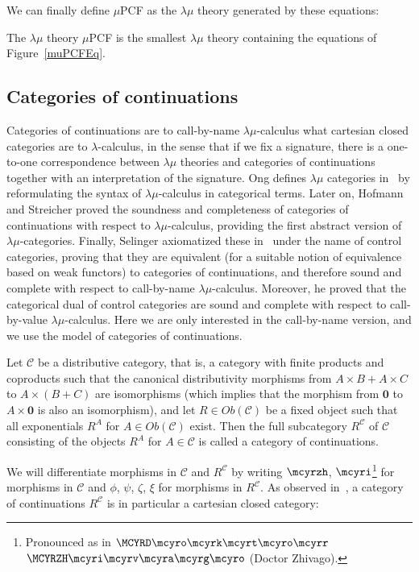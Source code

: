 \documentclass{CSML}
\newcommand*\CatC{\mathcal{C}}
\newcommand*\CatObj[1]{Ob\left(#1\right)}
\newcommand*\CatObjA{A}
\newcommand*\CatObjB{B}
\newcommand*\CatObjC{C}
\newcommand*\CatR{R}
\newcommand*\CatRC{\CatExp{\CatR}{\CatC}}
\newcommand*\CatTimes\times
\newcommand*\CatPlus{+}
\newcommand*\CatExp[2]{#1^{#2}}
\newcommand*\CatRCHomA\phi
\newcommand*\CatRCHomB\psi
\newcommand*\CatRCHomC\zeta
\newcommand*\CatRCHomD\xi
\newcommand*\CatCHomA\mcyrzh
\newcommand*\CatCHomB\mcyri
\newcommand*\CatInit{\mathbf{0}}
\begin{document}
We can finally define $\mu$PCF as the $\lambda\mu$ theory generated by these equations:
\begin{defi}[$\mu$PCF]
The $\lambda\mu$ theory $\mu$PCF is the smallest $\lambda\mu$ theory containing the equations of Figure~\ref{muPCFEq}.
\end{defi}
\subsection{Categories of continuations}
\label{catcont}
Categories of continuations are to call-by-name $\lambda\mu$-calculus what cartesian closed categories are to $\lambda$-calculus, in the sense that if we fix a signature, there is a one-to-one correspondence between $\lambda\mu$ theories and categories of continuations together with an interpretation of the signature. Ong defines $\lambda\mu$ categories in~\cite{OngClassicalProofs} by reformulating the syntax of $\lambda\mu$-calculus in categorical terms. Later on, Hofmann and Streicher proved the soundness and completeness of categories of continuations with respect to $\lambda\mu$-calculus, providing the first abstract version of $\lambda\mu$-categories. Finally, Selinger axiomatized these in~\cite{SelingerControl} under the name of control categories, proving that they are equivalent (for a suitable notion of equivalence based on weak functors) to categories of continuations, and therefore sound and complete with respect to call-by-name $\lambda\mu$-calculus. Moreover, he proved that the categorical dual of control categories are sound and complete with respect to call-by-value $\lambda\mu$-calculus. Here we are only interested in the call-by-name version, and we use the model of categories of continuations.
\begin{defi}
Let $\CatC$ be a distributive category, that is, a category with finite products and coproducts such that the canonical distributivity morphisms from $\CatObjA\CatTimes\CatObjB\CatPlus\CatObjA\CatTimes\CatObjC$ to $\CatObjA\CatTimes\left(\CatObjB\CatPlus\CatObjC\right)$ are isomorphisms (which implies that the morphism from $\CatInit$ to $\CatObjA\CatTimes\CatInit$ is also an isomorphism), and let $\CatR\in\CatObj{\CatC}$ be a fixed object such that all exponentials $\CatExp{\CatR}{\CatObjA}$ for $\CatObjA\in\CatObj{\CatC}$ exist. Then the full subcategory $\CatRC$ of $\CatC$ consisting of the objects $\CatExp{\CatR}{\CatObjA}$ for $\CatObjA\in\CatC$ is called a category of continuations.
\end{defi}
We will differentiate morphisms in $\CatC$ and $\CatRC$ by writing $\CatCHomA$, $\CatCHomB$\footnote{Pronounced as in $\MCYRD\mcyro\mcyrk\mcyrt\mcyro\mcyrr$ $\MCYRZH\mcyri\mcyrv\mcyra\mcyrg\mcyro$ (Doctor Zhivago).}  for morphisms in $\CatC$ and $\CatRCHomA$, $\CatRCHomB$, $\CatRCHomC$, $\CatRCHomD$ for morphisms in $\CatRC$. As observed in~\cite{LafontReusStreicher}, a category of continuations $\CatRC$ is in particular a cartesian closed category:
\end{document}
